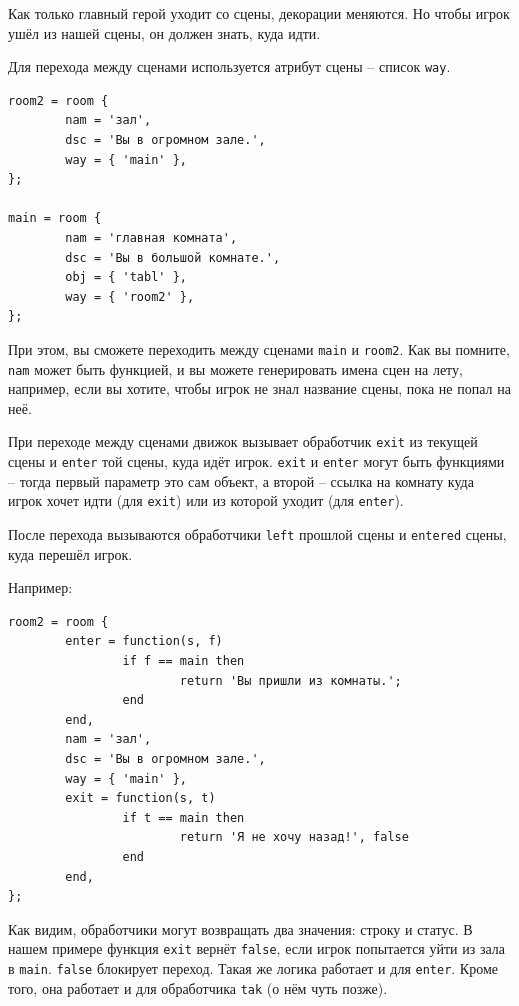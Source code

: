 \documentclass[a4paper,12pt]{article}
\begin{document}

Как только главный герой уходит со сцены, декорации меняются. Но чтобы игрок ушёл из нашей сцены, он должен знать, куда идти.

Для перехода между сценами используется атрибут сцены -- список \verb/way/.

\begin{verbatim}
room2 = room {
        nam = 'зал',
        dsc = 'Вы в огромном зале.',
        way = { 'main' },
};

main = room {
        nam = 'главная комната',
        dsc = 'Вы в большой комнате.',
        obj = { 'tabl' },
        way = { 'room2' },
};
\end{verbatim}

При этом, вы сможете переходить между сценами \verb/main/ и \verb/room2/. Как вы помните, \verb/nam/ может быть функцией, и вы можете генерировать имена сцен на лету, например, если вы хотите, чтобы игрок не знал название сцены, пока не попал на неё.

При переходе между сценами движок вызывает обработчик \verb/exit/ из текущей сцены и \verb/enter/ той сцены, куда идёт игрок. \verb/exit/ и \verb/enter/ могут быть функциями -- тогда первый параметр это сам объект, а второй -- ссылка на комнату куда игрок хочет идти (для \verb/exit/) или из которой уходит (для \verb/enter/).

После перехода вызываются обработчики \verb/left/ прошлой сцены и \verb/entered/ сцены, куда перешёл игрок.

Например:

\begin{verbatim}
room2 = room {
        enter = function(s, f)
                if f == main then
                        return 'Вы пришли из комнаты.';
                end
        end,
        nam = 'зал',
        dsc = 'Вы в огромном зале.',
        way = { 'main' },
        exit = function(s, t)
                if t == main then
                        return 'Я не хочу назад!', false
                end
        end,
};
\end{verbatim}

Как видим, обработчики могут возвращать два значения: строку и статус. В нашем примере функция \verb/exit/ вернёт \verb/false/, если игрок попытается уйти из зала в \verb/main/. \verb/false/ блокирует переход. Такая же логика работает и для \verb/enter/. Кроме того, она работает и для обработчика \verb/tak/ (о нём чуть позже).
\end{document}
